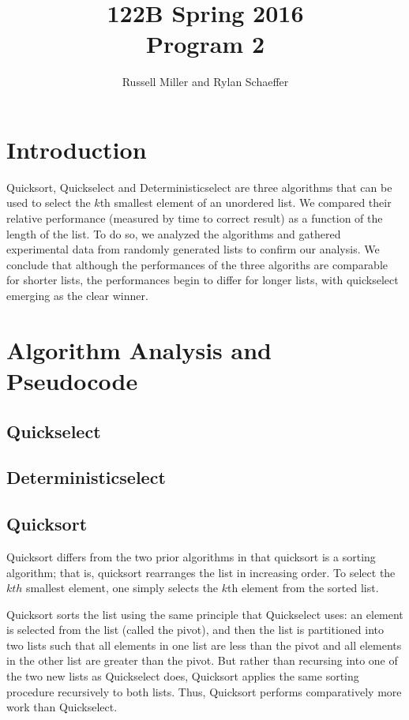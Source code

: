 \documentclass{article}
\title{122B Spring 2016 \\ Program 2}
\author{Russell Miller and Rylan Schaeffer }
\begin{document}
\maketitle

\section*{Introduction}
\indent \indent Quicksort, Quickselect and Deterministicselect are three algorithms that can be used to select the $k$th smallest element of an unordered list. We compared their relative performance (measured by time to correct result) as a function of the length of the list. To do so, we analyzed the algorithms and gathered experimental data from randomly generated lists to confirm our analysis. We conclude that although the performances of the three algoriths are comparable for shorter lists, the performances begin to differ for longer lists, with quickselect emerging as the clear winner.

\section*{Algorithm Analysis and Pseudocode}
\subsection*{Quickselect}
\indent \indent 



\subsection*{Deterministicselect}
\indent \indent 


\subsection*{Quicksort}
\indent \indent Quicksort differs from the two prior algorithms in that quicksort is a sorting algorithm; that is, quicksort rearranges the list in increasing order. To select the $kth$ smallest element, one simply selects the $k$th element from the sorted list.

Quicksort sorts the list using the same principle that Quickselect uses: an element is selected from the list (called the pivot), and then the list is partitioned into two lists such that all elements in one list are less than the pivot and all elements in the other list are greater than the pivot. But rather than recursing into one of the two new lists as Quickselect does, Quicksort applies the same sorting procedure recursively to both lists. Thus, Quicksort performs comparatively more work than Quickselect.
\end{document}
